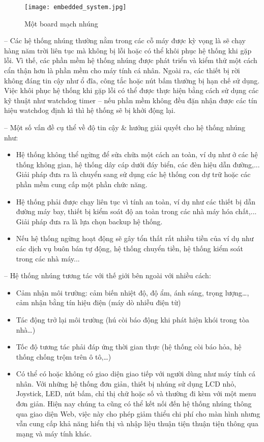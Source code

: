 \begin{figure}[H]
	\centering
	\texttt{[image: embedded\_system.jpg]}
	\caption{Một board mạch nhúng}
\end{figure}

	-- Các hệ thống nhúng thường nằm trong các cỗ máy được kỳ vọng là sẽ chạy hàng năm trời liên tục mà không bị lỗi hoặc có thể khôi phục hệ thống khi gặp lỗi. Vì thế, các phần mềm hệ thống nhúng được phát triển và kiểm thử một cách cẩn thận hơn là phần mềm cho máy tính cá nhân. Ngoài ra, các thiết bị rời không đáng tin cậy như ổ đĩa, công tắc hoặc nút bấm thường bị hạn chế sử dụng. Việc khôi phục hệ thống khi gặp lỗi có thể được thực hiện bằng cách sử dụng các kỹ thuật như watchdog timer – nếu phần mềm không đều đặn nhận được các tín hiệu watchdog định kì thì hệ thống sẽ bị khởi động lại.
	
	-- Một số vấn đề cụ thể về độ tin cậy \& hướng giải quyết cho hệ thống nhúng như:
\begin{itemize}[leftmargin=2.2cm]
		\item Hệ thống không thể ngừng để sửa chữa một cách an toàn, ví dụ như ở các hệ thống không gian, hệ thống dây cáp dưới đáy biển, các đèn hiệu dẫn đường,... Giải pháp đưa ra là chuyển sang sử dụng các hệ thống con dự trữ hoặc các phần mềm cung cấp một phần chức năng.
		
		\item Hệ thống phải được chạy liên tục vì tính an toàn, ví dụ như các thiết bị dẫn đường máy bay, thiết bị kiểm soát độ an toàn trong các nhà máy hóa chất,... Giải pháp đưa ra là lựa chọn backup hệ thống.
		
		\item Nếu hệ thống ngừng hoạt động sẽ gây tổn thất rất nhiều tiền của ví dụ như các dịch vụ buôn bán tự động, hệ thống chuyển tiền, hệ thống kiểm soát trong các nhà máy...
\end{itemize}

	-- Hệ thống nhúng tương tác với thế giới bên ngoài với nhiều cách:
\begin{itemize}[leftmargin=2.2cm]
	\item Cảm nhận môi trường: cảm biến nhiệt độ, độ ẩm, ánh sáng, trọng lượng…, cảm nhận bằng tín hiệu điện (máy dò nhiễu điện từ)
	
	\item Tác động trở lại môi trường (hú còi báo động khi phát hiện khói trong tòa nhà…)
	
	\item Tốc độ tương tác phải đáp ứng thời gian thực (hệ thống còi báo hỏa, hệ thống chống trộm trên ô tô,…)
	
	\item Có thể có hoặc không có giao diện giao tiếp với người dùng như máy tính cá nhân. Với những hệ thống đơn giản, thiết bị nhúng sử dụng LCD nhỏ, Joystick, LED, nút bấm, chỉ thị chữ hoặc số và thường đi kèm với một menu đơn giản. Hiện nay chúng ta cũng có thể kết nối đến hệ thống nhúng thông qua giao diện Web, việc này cho phép giảm thiểu chi phí cho màn hình nhưng vẫn cung cấp khả năng hiển thị và nhập liệu thuận tiện thuận tiện thông qua mạng và máy tính khác.
\end{itemize}	
	
